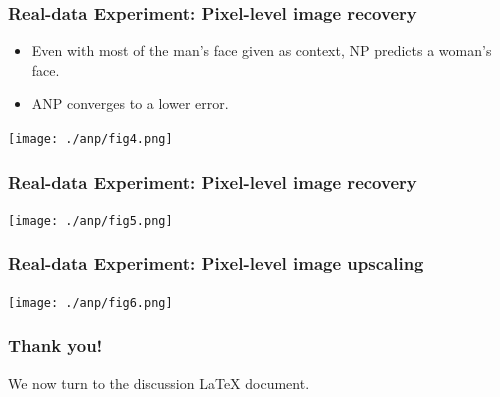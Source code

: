 \documentclass[t]{beamer}
\begin{document}
\begin{frame}
  \frametitle{Real-data Experiment: Pixel-level image recovery} 
  \begin{itemize}
  \item Even with most of the man's face given as context, NP predicts a woman's face. 
  \item ANP converges to a lower error.
  \end{itemize}
  \texttt{[image: ./anp/fig4.png]}
\end{frame}

\begin{frame}
  \frametitle{Real-data Experiment: Pixel-level image recovery} 
  \texttt{[image: ./anp/fig5.png]}
\end{frame}

\begin{frame}
  \frametitle{Real-data Experiment: Pixel-level image upscaling} 
  \texttt{[image: ./anp/fig6.png]}
\end{frame}

\begin{frame}
  \frametitle{Thank you!}

  We now turn to the discussion LaTeX document.
\end{frame}
\end{document}
